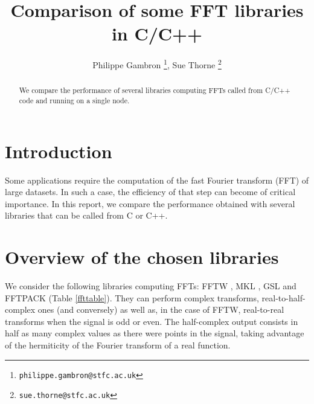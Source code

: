 \documentclass[12pt, a4paper]{article}
\date{}
\begin{document}
\title{Comparison of some FFT libraries in C/C++}
\author{Philippe Gambron \thanks{\texttt{philippe.gambron{@}stfc.ac.uk}}, Sue Thorne \thanks{\texttt{sue.thorne{@}stfc.ac.uk}}}
\maketitle
\begin{abstract}
We compare the performance of several libraries computing FFTs called from C/C++ code and running on a single node. 
\end{abstract}
\section{Introduction}
Some applications require the computation of the fast Fourier transform (FFT) of large datasets. In such a case, the efficiency of that step can become of critical importance. In this report, we compare the performance obtained with several libraries that can be called from C or C++.
\section{Overview of the chosen libraries}
We consider the following libraries computing FFTs: FFTW \cite{fftw}, MKL \cite{mkl}, GSL \cite{gsl} and FFTPACK \cite{fftpack} (Table \ref{ffttable}). They can perform complex transforms, real-to-half-complex ones (and conversely) as well as, in the case of FFTW, real-to-real transforms when the signal is odd or even. The half-complex output consists in half as many complex values as there were points in the signal, taking advantage of the hermiticity of the Fourier transform of a real function.\\
\end{document}
